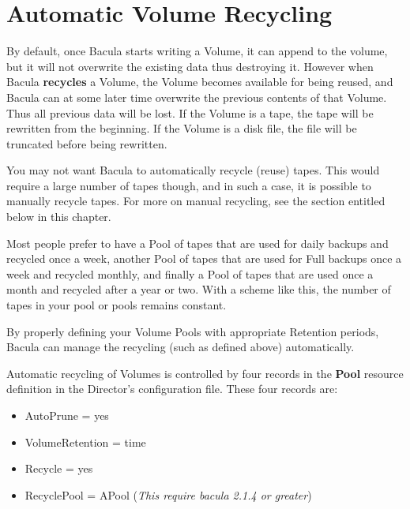 
\chapter{Automatic Volume Recycling}
\label{RecyclingChapter}

By default, once Bacula starts writing a Volume, it can append to the
volume, but it will not overwrite the existing data thus destroying it.
However when Bacula {\bf recycles} a Volume, the Volume becomes available
for being reused, and Bacula can at some later time overwrite the previous
contents of that Volume.  Thus all previous data will be lost.  If the
Volume is a tape, the tape will be rewritten from the beginning.  If the
Volume is a disk file, the file will be truncated before being rewritten.

You may not want Bacula to automatically recycle (reuse) tapes.  This would
require a large number of tapes though, and in such a case, it is possible
to manually recycle tapes.  For more on manual recycling, see the section
entitled  below in this
chapter.

Most people prefer to have a Pool of tapes that are used for daily backups and
recycled once a week, another Pool of tapes that are used for Full backups
once a week and recycled monthly, and finally a Pool of tapes that are used
once a month and recycled after a year or two. With a scheme like this, the 
number of tapes in your pool or pools remains constant.

By properly defining your Volume Pools with appropriate Retention periods,
Bacula can manage the recycling (such as defined above) automatically. 

Automatic recycling of Volumes is controlled by four records in the {\bf
Pool} resource definition in the Director's configuration file. These four
records are: 

\begin{itemize}
\item AutoPrune = yes 
\item VolumeRetention = \lt{}time\gt{} 
\item Recycle = yes
\item RecyclePool = \lt{}APool\gt{} (\textit{This require bacula 2.1.4 or greater})
\end{itemize}

